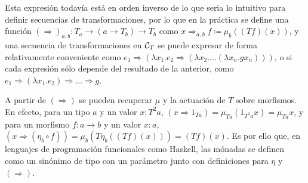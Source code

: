 Esta expresión todavía está en orden inverso de lo que seria lo intuitivo para
definir secuencias de transformaciones, por lo que en la práctica se define una
función $(\Rightarrow)_{a,b}:T_a\to(a\to T_b)\to T_b$ como
$x\Rightarrow_{a,b} f\coloneqq\mu_b((Tf)(x))$, y una secuencia de
transformaciones en $\mathcal{C}_T$ se puede expresar de forma relativamente conveniente
como
$e_1\Rightarrow(\lambda x_1.e_2\Rightarrow(\lambda x_2.\dots(\lambda
x_n.gx_n)))$, o si cada expresión sólo depende del resultado de la anterior,
como $e_1\Rightarrow(\lambda x_1.e_2)\Rightarrow\dots\Rightarrow g$.

A partir de $(\Rightarrow)$ se pueden recuperar $\mu$ y la actuación de $T$
sobre morfismos. En efecto, para un tipo $a$ y un valor $x:T^2a$,
$(x\Rightarrow 1_{Ta})=\mu_{Ta}(1_{T^2a}x)=\mu_{Ta}x$, y para un morfismo
$f:a\to b$ y un valor $x:a$,
$(x\Rightarrow(\eta_b\circ f))=\mu_b(T\eta_b((Tf)(x)))=(Tf)(x)$. Es por ello
que, en lenguajes de programación funcionales como Haskell, las mónadas se
definen como un sinónimo de tipo con un parámetro junto con definiciones para
$\eta$ y $(\Rightarrow)$.\cite[p. 6]{haskmon}

